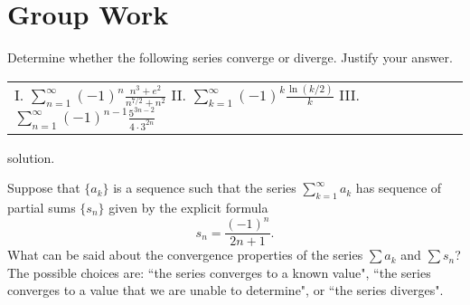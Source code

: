 \documentclass[handout]{ximera}
\begin{document}
\section{Group Work}

\begin{problem}
Determine whether the following series converge or diverge. Justify your answer.
\begin{center}
\begin{tabular}{lll}
I. $\sum_{n=1}^\infty (-1)^n \frac{n^3+e^2}{n^{7/2}+n^2}$ \hspace{.2in} II. $\sum_{k=1}^\infty (-1)^k \frac{\ln(k/2)}{k}$ \hspace{.2in} III. $\sum_{n=1}^\infty (-1)^{n-1} \frac{5^{3n-2}}{4 \cdot 3^{2n}}$ 
\end{tabular}
\end{center}

\begin{solution}
solution.
\end{solution}
\end{problem}

\begin{problem}
Suppose that $\{a_k\}$ is a sequence such that the series $\sum_{k=1}^\infty a_k$ has sequence of partial sums $\{s_n\}$ given by the explicit formula
$$
s_n = \frac{(-1)^n}{2n+1}.
$$
What can be said about the convergence properties of the series $\sum a_k$ and $\sum s_n$? The possible choices are: ``the series converges to a known value", ``the series converges to a value that we are unable to determine", or ``the series diverges". 
\end{problem}
\end{document}
